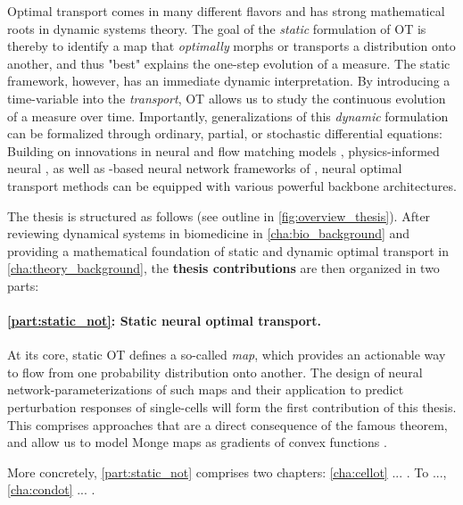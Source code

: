 Optimal transport comes in many different flavors and has strong mathematical roots in dynamic systems theory.
The goal of the \emph{static} formulation of OT is thereby to identify a map that \emph{optimally} morphs or transports a distribution onto another, and thus "best" explains the one-step evolution of a measure.
The static framework, however, has an immediate dynamic interpretation. By introducing a time-variable into the \emph{transport}, OT allows us to study the continuous evolution of a measure over time. %
Importantly, generalizations of this \emph{dynamic} formulation can be formalized through ordinary, partial, or stochastic differential equations: Building on innovations in neural  \citep{chen2018neural} and flow matching models \citep{lipman2023flow, pooladian2023multisample, liu2022flow}, physics-informed neural  \citep{brandstetter2022message, raissi2019physics}, as well as -based neural network frameworks of , neural optimal transport methods can be equipped with various powerful backbone architectures.

The thesis is structured as follows (see outline in \cref{fig:overview_thesis}).
After reviewing dynamical systems in biomedicine in \cref{cha:bio_background} and providing a mathematical foundation of static and dynamic optimal transport in \cref{cha:theory_background}, the \textbf{thesis contributions} are then organized in two parts:

\paragraph{\cref{part:static_not}: Static neural optimal transport.}

At its core, static OT defines a so-called \citeauthor{monge1781histoire} \textit{map}, which provides an actionable way to flow from one probability distribution onto another.
The design of neural network-parameterizations of such maps and their application to predict perturbation responses of single-cells will form the first contribution of this thesis.
This comprises approaches that are a direct consequence of the famous \citeauthor{brenier1987decomposition} theorem, and allow us to model Monge maps as gradients of convex functions \citep{bunne2021learning, bunne2022supervised}.

More concretely, \cref{part:static_not} comprises two chapters:
\cref{cha:cellot} ... \citep{bunne2021learning}. To ..., \cref{cha:condot} ... \citep{bunne2022supervised}. \\
	
